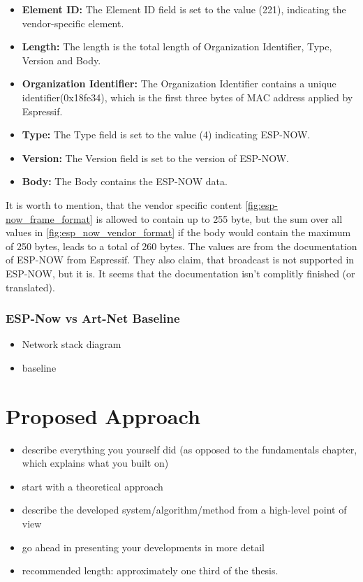 \documentclass[]{ccs-thesis}
\begin{document}
\begin{itemize}
	\setlength\itemsep{-0.5em}
	\item \textbf{Element ID:} The Element ID field is set to the value (221), indicating the vendor-specific element.
	\item \textbf{Length:} The length is the total length of Organization Identifier, Type, Version and Body.
	\item \textbf{Organization Identifier:} The Organization Identifier contains a unique identifier(0x18fe34), which is the first three bytes of MAC address applied by Espressif.
	\item \textbf{Type:} The Type field is set to the value (4) indicating ESP-NOW.
	\item \textbf{Version:} The Version field is set to the version of ESP-NOW.
	\item \textbf{Body:} The Body contains the ESP-NOW data.
\end{itemize}

It is worth to mention, that the vendor specific content \ref{fig:esp-now_frame_format} is allowed to contain up to 255 byte,
but the sum over all values in \ref{fig:esp_now_vendor_format} if the body would contain the maximum of 250 bytes, 
leads to a total of 260 bytes.
The values are from the documentation of ESP-NOW from Espressif.
They also claim, that broadcast is not supported in ESP-NOW, but it is.
It seems that the documentation isn't complitly finished (or translated).

\subsection{ESP-Now vs Art-Net Baseline}
\begin{itemize}
	\item Network stack diagram
	\item baseline
\end{itemize}

\lipsum[1]

\chapter{Proposed Approach}
\begin{itemize}
\item describe everything you yourself did (as opposed to the fundamentals chapter, which explains what you built on)
\item start with a theoretical approach
\item describe the developed system/algorithm/method from a high-level point of view
\item go ahead in presenting your developments in more detail
\item recommended length: approximately one third of the thesis.
\end{itemize}
\end{document}
